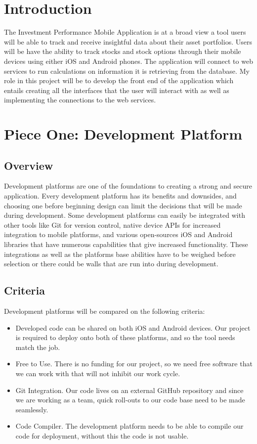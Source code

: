 \documentclass[onecolumn, draftclsnofoot,10pt, compsoc]{IEEEtran}
\begin{document}
\begin{singlespace}
\section{Introduction}

The Investment Performance Mobile Application is at a broad view a tool users will be able to track and receive insightful data about their asset portfolios. Users will be have the ability
to track stocks and stock options through their mobile devices using either iOS and Android phones. The application will connect to web services to run calculations on information it is retrieving from the database.
My role in this project will  be to develop the front end of the application which entails creating all the 
interfaces that the user will interact with as well as implementing the connections to the web services.

\section{Piece One: Development Platform}
\subsection{Overview}
Development platforms are one of the foundations to creating a strong and secure application. Every development platform has its benefits and downsides, and choosing
one before beginning design can limit the decisions that will be made during development. Some development platforms can easily be integrated with other tools like Git for
version control, native device APIs for increased integration to mobile platforms, and various open-sources iOS and Android libraries that have numerous capabilities that give increased
functionality. These integrations as well as the platforms base abilities have to be weighed before selection or there could be walls that are run into during development.

\subsection{Criteria}
Development platforms will be compared on the following criteria:
\begin{itemize}
	\item Developed code can be shared on both iOS and Android devices. Our project is required to deploy onto both of these platforms, and so the tool needs match the job.
	\item Free to Use. There  is no funding for our project, so we need free software that we can work with that will not inhibit our work cycle.
	\item Git Integration. Our code lives on an external GitHub repository and since we are working as a team, quick roll-outs to our code base need to be made seamlessly.
	\item Code Compiler. The development platform needs to be able to compile our code for deployment, without this the code is not usable.
\end{itemize}

\end{singlespace}
\end{document}
